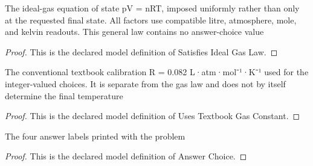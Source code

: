 \begin{definition}
  \label{def:physics:phyx-mini-0361:phyxminiproblems-problemphyxmini0361-satisfiesidealgaslaw}
  The ideal-gas equation of state pV = nRT, imposed uniformly rather than only at the requested final state. All factors use compatible litre, atmosphere, mole, and kelvin readouts. This general law contains no answer-choice value
\end{definition}
\begin{proof}
  This is the declared model definition of Satisfies Ideal Gas Law.
\end{proof}
\begin{definition}
  \label{def:physics:phyx-mini-0361:phyxminiproblems-problemphyxmini0361-usestextbookgasconstant}
  The conventional textbook calibration R = 0.082 L·atm·mol⁻¹·K⁻¹ used for the integer-valued choices. It is separate from the gas law and does not by itself determine the final temperature
\end{definition}
\begin{proof}
  This is the declared model definition of Uses Textbook Gas Constant.
\end{proof}
\begin{definition}
  \label{def:physics:phyx-mini-0361:phyxminiproblems-problemphyxmini0361-answerchoice}
  The four answer labels printed with the problem
\end{definition}
\begin{proof}
  This is the declared model definition of Answer Choice.
\end{proof}
